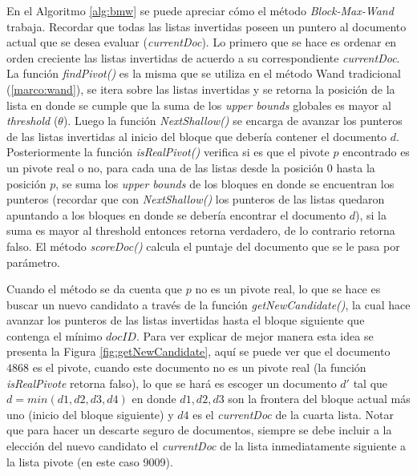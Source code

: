 En el Algoritmo \ref{alg:bmw} se puede apreciar cómo el método \textit{Block-Max-Wand} trabaja. Recordar que todas las listas invertidas poseen un puntero al documento actual que se desea evaluar (\textit{currentDoc}). Lo primero que se hace es ordenar en orden creciente las listas invertidas de acuerdo a su correspondiente \textit{currentDoc}. La función \textit{findPivot()} es la misma que se utiliza en el método Wand tradicional (\ref{marco:wand}), se itera sobre las listas invertidas y se retorna la posición de la lista en donde se cumple que la suma de los \textit{upper bounds} globales es mayor al \textit{threshold} ($\theta$). Luego la función \textit{NextShallow()} se encarga de avanzar los punteros de las listas invertidas al inicio del bloque que debería contener el documento $d$. Posteriormente la función \textit{isRealPivot()} verifica si es que el pivote $p$ encontrado es un pivote real o no, para cada una de las listas desde la posición $0$ hasta la posición $p$, se suma los \textit{upper bounds} de los bloques en donde se encuentran los punteros (recordar que con \textit{NextShallow()} los punteros de las listas quedaron apuntando a los bloques en donde se debería encontrar el documento $d$), si la suma es mayor al threshold entonces retorna verdadero, de lo contrario retorna falso. El método \textit{scoreDoc()} calcula el puntaje del documento que se le pasa por parámetro. 

Cuando el método se da cuenta que $p$ no es un pivote real, lo que se hace es buscar un nuevo candidato a través de la función \textit{getNewCandidate()}, la cual hace avanzar los punteros de las listas invertidas hasta el bloque siguiente que contenga el mínimo $docID$. Para ver explicar de mejor manera esta idea se presenta la Figura \ref{fig:getNewCandidate}, aquí se puede ver que el documento $4868$ es el pivote, cuando este documento no es un pivote real (la función \textit{isRealPivote} retorna falso), lo que se hará es escoger un documento $d'$ tal que $d = min(d1,d2,d3,d4)$ en donde $d1,d2,d3$ son la frontera del bloque actual más uno (inicio del bloque siguiente) y $d4$ es el \textit{currentDoc} de la cuarta lista. Notar que para hacer un descarte seguro de documentos, siempre se debe incluir a la elección del nuevo candidato el \textit{currentDoc} de la lista inmediatamente siguiente a la lista pivote (en este caso 9009).  

